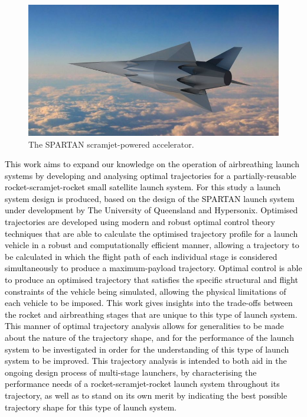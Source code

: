   	     	  	\begin{figure}[ht]
  	     	  		\centering
  	     	  		\includegraphics[width=0.6\linewidth]{figures/1_introduction/project-spartan}
  	     	  		\caption{The SPARTAN scramjet-powered accelerator\cite{BBC}.}
  	     	  		\label{fig:project-spartan}
  	     	  	\end{figure}
  	   \textcolor{black}{
  	   This work aims to expand our knowledge on the operation of airbreathing launch systems by developing and analysing optimal trajectories for a partially-reusable rocket-scramjet-rocket small satellite launch system. For this study a launch system design is produced, based on the design of the SPARTAN launch system under development by The University of Queensland and Hypersonix\cite{Preller2017b}.
  	   Optimised trajectories are developed using modern and robust optimal control theory techniques that are able to calculate the optimised trajectory profile for a launch vehicle in a robust and computationally efficient manner, allowing a trajectory to be calculated in which the flight path of each individual stage is considered simultaneously to produce a maximum-payload trajectory\cite{Betts1998}. 
  	   Optimal control is able to produce an optimised trajectory that satisfies the specific structural and flight constraints of the vehicle being simulated, allowing the physical limitations of each vehicle  to be imposed\cite{Betts1998}.
  	   This work gives insights into the trade-offs between the rocket and airbreathing stages that are unique to this type of launch system. This manner of optimal trajectory analysis allows for generalities to be made about the nature of the trajectory shape, and for the performance of the launch system to be investigated in order for the understanding of this type of launch system to be improved.
  	   This trajectory analysis is intended to both aid in the ongoing design process of multi-stage launchers, by characterising the performance needs of a rocket-scramjet-rocket launch system throughout its trajectory, as well as to stand on its own merit by indicating the best possible trajectory shape for this type of launch system. 
  	}
  	   
